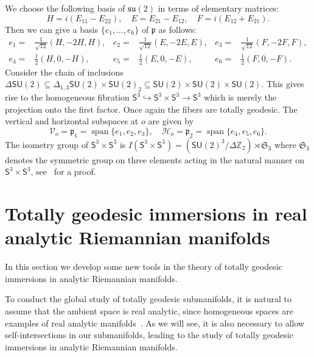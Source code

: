 \documentclass[11pt,a4paper,final]{amsart}
\newcommand{\g}{\mathfrak}
\newcommand{\vecspan}{\operatorname{span}}
\theoremstyle{definition}
\begin{document}
We choose the following basis of $\g{su}(2)$ in terms of elementary matrices:
\begin{equation}\label{eq:su2Matrices}
	H=i(E_{11}-E_{22}),\quad
	E=E_{21}-E_{12},\quad
	F=i(E_{12}+E_{21}).
\end{equation}
Then we can give a basis $\{e_{1},\dots,e_{6}\}$ of $\g{p}$ as follows:
\begin{align*}
	e_{1}={}&\frac{1}{\sqrt{12}}\left(H,-2H,H\right), & e_{2}={}&\frac{1}{\sqrt{12}}\left(E,-2E,E\right), & e_{3}={}&\frac{1}{\sqrt{12}}\left(F,-2F,F\right), \\
	e_{4}={}&\frac{1}{2}\left(H,0,-H\right), &
	e_{5}={}&\frac{1}{2}\left(E,0,-E\right), &
	e_{6}={}&\frac{1}{2}\left(F,0,-F\right).
\end{align*}
Consider the chain of inclusions $\Delta\mathsf{SU}(2)\subseteq \Delta_{1,3}\mathsf{SU}(2)\times\mathsf{SU}(2)_{2}\subseteq\mathsf{SU}(2)\times\mathsf{SU}(2)\times\mathsf{SU}(2)$.
This gives rise to the homogeneous fibration $\mathsf{S}^{3}\hookrightarrow \mathsf{S}^{3}\times\mathsf{S}^{3}\to\mathsf{S}^{3}$ which is merely the projection onto the first factor.
Once again the fibers are totally geodesic.
The vertical and horizontal subspaces at $o$ are given by
\begin{equation*}
	\mathcal{V}_{o}=\g{p}_{1}=\vecspan\{e_{1},e_{2},e_{3}\}, \quad
	\mathcal{H}_{o}=\g{p}_{2}=\vecspan\{e_{4},e_{5},e_{6}\}.
\end{equation*}	
The isometry group of $\mathsf{S}^{3}\times\mathsf{S}^{3}$ is $I(\mathsf{S}^{3}\times\mathsf{S}^{3})=(\mathsf{SU}(2)^{3}/\Delta \mathbb{Z}_{2})\rtimes \mathfrak{S}_{3}$
where $\mathfrak{S}_{3}$ denotes the symmetric group on three elements acting in the natural manner on $\mathsf{S}^{3}\times\mathsf{S}^{3}$, see~\cite[Lemma 3.3]{VasquezIsospectral} for a proof.
	
\section{Totally geodesic immersions in real analytic Riemannian manifolds}
\label{sec:tganalytic}
In this section we develop some new tools in the theory of totally geodesic immersions in analytic Riemannian manifolds.

To conduct the global study of totally geodesic submanifolds, it is natural to assume that the ambient space is real analytic, since homogeneous spaces are examples of real analytic manifolds~\cite[Proposition~4.2]{KobayashiNomizu}.
As we will see, it is also necessary to allow self-intersections in our submanifolds, leading to the study of totally geodesic immersions in analytic Riemannian manifolds. 
\end{document}
